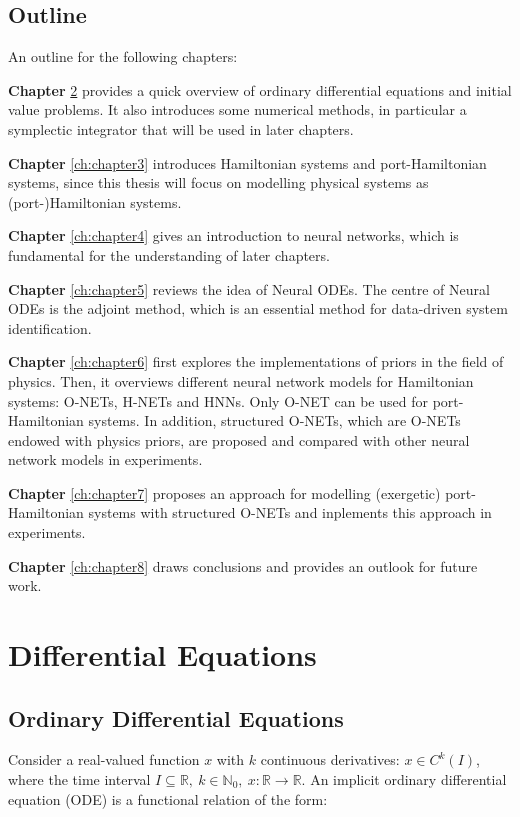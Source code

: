 \documentclass[
	parskip, 			   %
	twoside, 			   %
	DIV=14, 			   %
	BCOR=15.0mm, 		   %
	headsepline, 		   %
	open=right, 		   %
	captions=tableheading, %
	bibliography=totoc,    %
	numbers=noenddot       %
]{scrreprt}
\begin{document}
\section{Outline}
An outline for the following chapters:

\textbf{Chapter} \ref{ch:chapter2} provides a quick overview of ordinary differential equations and initial value problems. It also introduces some numerical methods, in particular a symplectic integrator that will be used in later chapters.

\textbf{Chapter} \ref{ch:chapter3} introduces Hamiltonian systems and port-Hamiltonian systems, since this thesis will focus on modelling physical systems as (port-)Hamiltonian systems.

\textbf{Chapter} \ref{ch:chapter4} gives an introduction to neural networks, which is fundamental for the understanding of later chapters.

\textbf{Chapter} \ref{ch:chapter5} reviews the idea of Neural ODEs. The centre of Neural ODEs is the adjoint method, which is an essential method for data-driven system identification.

\textbf{Chapter} \ref{ch:chapter6} first explores the implementations of priors in the field of physics. Then, it overviews different neural network models for Hamiltonian systems: O-NETs, H-NETs and HNNs. Only O-NET can be used for port-Hamiltonian systems. In addition, structured O-NETs, which are O-NETs endowed with physics priors, are proposed and compared with other neural network models in experiments.

\textbf{Chapter} \ref{ch:chapter7} proposes an approach for modelling (exergetic) port-Hamiltonian systems with structured O-NETs and inplements this approach in experiments.

\textbf{Chapter} \ref{ch:chapter8} draws conclusions and provides an outlook for future work.


\clearpage
\chapter{Differential Equations}
\label{ch:chapter2}

\section{Ordinary Differential Equations}
Consider a real-valued function $x$ with $k$ continuous derivatives: $x \in C^{k}(I)$, where the time interval $ I \subseteq \mathbb{R}, \: k \in \mathbb{N}_{0}, \: x: \mathbb{R} \rightarrow \mathbb{R}$. An implicit ordinary differential equation (ODE) is a functional relation of the form:
\end{document}
